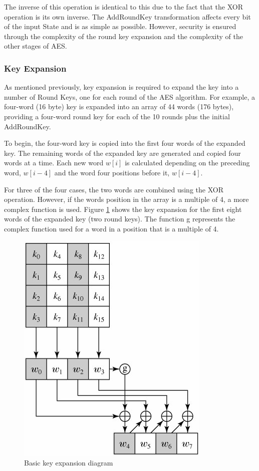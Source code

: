 \documentclass[a4paper,12pt]{report}
\begin{document}
The inverse of this operation is identical to this due to the fact that the XOR operation is its own inverse. The AddRoundKey transformation affects every bit of the input State and is as simple as possible. However, security is ensured through the complexity of the round key expansion and the complexity of the other stages of AES. 

\subsubsection{Key Expansion}

As mentioned previously, key expansion is required to expand the key into a number of Round Keys, one for each round of the AES algorithm. For example, a four-word (16 byte) key is expanded into an array of 44 words (176 bytes), providing a four-word round key for each of the 10 rounds plus the initial AddRoundKey. 

To begin, the four-word key is copied into the first four words of the expanded key. The remaining words of the expanded key are generated and copied four words at a time. Each new word $w[i]$ is calculated depending on the preceding word, $w[i-4]$ and the word four positions before it, $w[i-4]$. 

For three of the four cases, the two words are combined using the XOR operation. However, if the words position in the array is a multiple of 4, a more complex function is used. Figure \ref{fig:keyexp1} shows the key expansion for the first eight words of the expanded key (two round keys). The function g represents the complex function used for a word in a position that is a multiple of 4.

\begin{figure}[htb]
\centering
\includegraphics[scale=0.7]{images/keyexp1.jpg}
\caption{Basic key expansion diagram}
\label{fig:keyexp1}
\end{figure}
\end{document}
